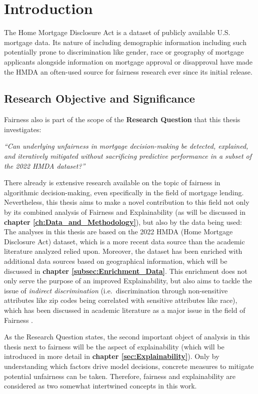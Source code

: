 \chapter{Introduction}\label{ch:Introduction}

The Home Mortgage Disclosure Act \parencite{HMDA2022} is a dataset of publicly available U.S. mortgage data. Its nature of including demographic information including such potentially prone to discrimination like gender, race or geography of mortgage applicants alongside information on mortgage approval or disapproval have made the HMDA an often-used source for fairness research ever since its initial release.

\section{Research Objective and Significance}\label{sec:Research_Objective_and_Significance}

Fairness also is part of the scope of the \textbf{Research Question} that this thesis investigates:

\textit{“Can underlying unfairness in mortgage decision-making be detected, explained, and iteratively mitigated without sacrificing predictive performance in a subset of the 2022 HMDA dataset?”}

There already is extensive research available on the topic of fairness in algorithmic decision-making, even specifically in the field of mortgage lending.
Nevertheless, this thesis aims to make a novel contribution to this field not only by its combined analysis of Fairness and Explainability (as will be discussed in \textbf{chapter \ref{ch:Data_and_Methodology}}),
but also by the data being used: The analyses in this thesis are based on the 2022 HMDA (Home Mortgage Disclosure Act) dataset, which is a more recent data source than the academic literature analyzed relied upon.
Moreover, the dataset has been enriched with additional data sources based on geographical information, which will be discussed in \textbf{chapter \ref{subsec:Enrichment_Data}}.
This enrichment does not only serve the purpose of an improved Explainability, but also aims to tackle the issue of \textit{indirect discrimination} (i.e.\ discrimination through non-sensitive attributes like zip codes being correlated with sensitive attributes like race), 
which has been discussed in academic literature as a major issue in the field of Fairness \parencite{Mehrabi2021}.

As the Research Question states, the second important object of analysis in this thesis next to fairness will be the aspect of explainability (which will be introduced in more detail in \textbf{chapter \ref{sec:Explainability}}). Only by understanding which factors drive model decisions, concrete measures to mitigate potential unfairness can be taken. Therefore, fairness and explainability are considered as two somewhat intertwined concepts in this work.